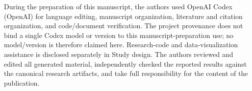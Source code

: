 \documentclass[preprint,11pt,authoryear]{elsarticle}          %
\begin{document}
\begin{sloppypar}
During the preparation of this manuscript, the authors used OpenAI Codex (OpenAI) for language editing, manuscript organization, literature and citation organization, and code/document verification. The project provenance does not bind a single Codex model or version to this manuscript-preparation use; no model/version is therefore claimed here. Research-code and data-visualization assistance is disclosed separately in Study design. The authors reviewed and edited all generated material, independently checked the reported results against the canonical research artifacts, and take full responsibility for the content of the publication.
\end{sloppypar}



\end{document}
